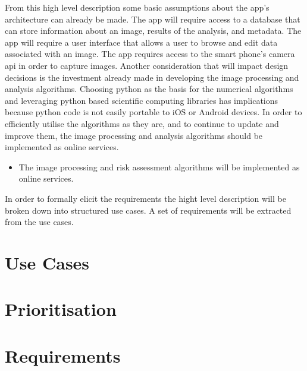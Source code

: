 From this high level description some basic assumptions about the app’s architecture can already be made. The app will require access to a database that can store information about an image, results of the analysis, and metadata. The app will require a user interface that allows a user to browse and edit data associated with an image. The app requires access to the smart phone’s camera api in order to capture images.
Another consideration that will impact design decisions is the investment already made in developing the image processing and analysis algorithms. Choosing python as the basis for the numerical algorithms and leveraging python based scientific computing libraries has implications because python code is not easily portable to iOS or Android devices. In order to efficiently utilise the algorithms as they are, and to continue to update and improve them, the image processing and analysis algorithms should be implemented as online services.

\begin{itemize}[label={}]
\item The image processing and risk assessment algorithms will be implemented as online services.
\end{itemize}

In order to formally elicit the requirements the hight level description will be broken down into structured use cases. A set of requirements will be extracted from the use cases.

\section{Use Cases}


\section{Prioritisation}


\section{Requirements}






